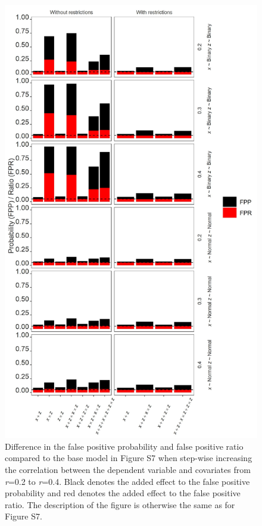 \begin{figure}[hbt!]
\includegraphics{R/Analysis/Result/Figures/Figure2SIBon.jpeg}
\centering
\caption{Difference in the false positive probability and false positive ratio compared to the base model in Figure S7 when step-wise increasing the correlation between the dependent variable and covariates from \textit{r}=0.2 to \textit{r}=0.4. Black denotes the added effect to the false positive probability and red denotes the added effect to the false positive ratio.  The description of the figure is otherwise the same as for Figure S7.}
\label{fig:mainfigure}
\end{figure}


